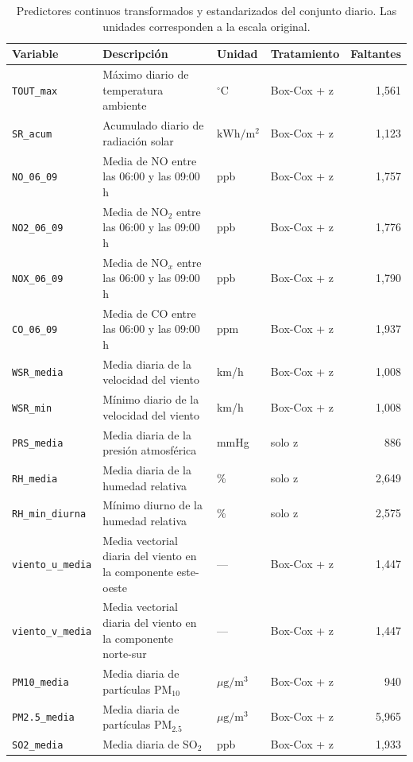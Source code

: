 \begin{table}[t]
  \centering
  \caption{Predictores continuos transformados y estandarizados del conjunto
    diario. Las unidades corresponden a la escala original.}
  \label{tab:dic-diario-continuas}
  \footnotesize
  \setlength{\tabcolsep}{4pt}
  \begin{tabular}{lp{7.2cm}llr}
    \toprule
    Variable & Descripción & Unidad & Tratamiento & Faltantes \\
    \midrule
    \texttt{TOUT\_max} & Máximo diario de temperatura ambiente
      & $^{\circ}\mathrm{C}$ & Box-Cox + z & 1,561 \\
    \texttt{SR\_acum} & Acumulado diario de radiación solar
      & $\mathrm{kWh}/\mathrm{m}^{2}$ & Box-Cox + z & 1,123 \\
    \texttt{NO\_06\_09} & Media de NO entre las 06:00 y las 09:00 h
      & ppb & Box-Cox + z & 1,757 \\
    \texttt{NO2\_06\_09} & Media de NO$_2$ entre las 06:00 y las 09:00 h
      & ppb & Box-Cox + z & 1,776 \\
    \texttt{NOX\_06\_09} & Media de NO$_x$ entre las 06:00 y las 09:00 h
      & ppb & Box-Cox + z & 1,790 \\
    \texttt{CO\_06\_09} & Media de CO entre las 06:00 y las 09:00 h
      & ppm & Box-Cox + z & 1,937 \\
    \texttt{WSR\_media} & Media diaria de la velocidad del viento
      & km/h & Box-Cox + z & 1,008 \\
    \texttt{WSR\_min} & Mínimo diario de la velocidad del viento
      & km/h & Box-Cox + z & 1,008 \\
    \texttt{PRS\_media} & Media diaria de la presión atmosférica
      & mmHg & solo z & 886 \\
    \texttt{RH\_media} & Media diaria de la humedad relativa
      & \% & solo z & 2,649 \\
    \texttt{RH\_min\_diurna} & Mínimo diurno de la humedad relativa
      & \% & solo z & 2,575 \\
    \texttt{viento\_u\_media} & Media vectorial diaria del viento en la
      componente este-oeste & --- & Box-Cox + z & 1,447 \\
    \texttt{viento\_v\_media} & Media vectorial diaria del viento en la
      componente norte-sur & --- & Box-Cox + z & 1,447 \\
    \texttt{PM10\_media} & Media diaria de partículas PM$_{10}$
      & $\mu\mathrm{g}/\mathrm{m}^{3}$ & Box-Cox + z & 940 \\
    \texttt{PM2.5\_media} & Media diaria de partículas PM$_{2.5}$
      & $\mu\mathrm{g}/\mathrm{m}^{3}$ & Box-Cox + z & 5,965 \\
    \texttt{SO2\_media} & Media diaria de SO$_2$
      & ppb & Box-Cox + z & 1,933 \\
    \bottomrule
  \end{tabular}
\end{table}

